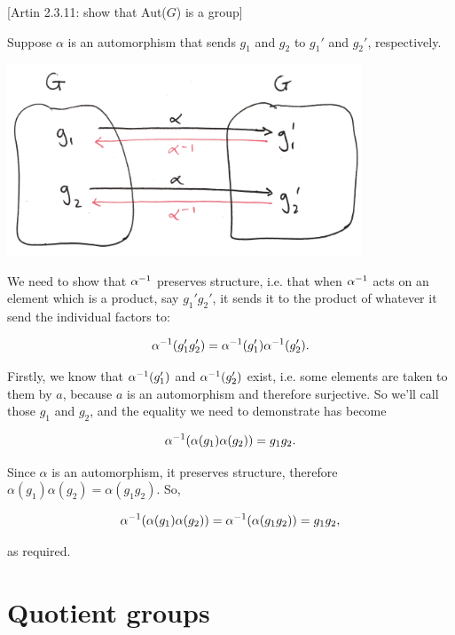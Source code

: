 [Artin 2.3.11: show that Aut($G$) is a group]

Suppose $\alpha$ is an automorphism that sends $g_1$ and $g_2$ to $g_1'$ and
$g_2'$, respectively.

\begin{mdframed}
\includegraphics[width=300pt]{img/inverse-of-automorphism-1.png}
\end{mdframed}

We need to show that $\alpha^{-1}$ preserves structure, i.e. that when $\alpha^{-1}$ acts
on an element which is a product, say $g_1'g_2'$, it sends it to the product of
whatever it send the individual factors to:

$$
\alpha^{-1}(g_1'g_2') = \alpha^{-1}(g_1')\alpha^{-1}(g_2').
$$


Firstly, we know that $\alpha^{-1}(g_1')$ and $\alpha^{-1}(g_2')$ exist, i.e. some elements
are taken to them by $a$, because $a$ is an automorphism and therefore
surjective. So we'll call those $g_1$ and $g_2$, and the equality we need to
demonstrate has become

$$
\alpha^{-1}(\alpha(g_1)\alpha(g_2)) = g_1g_2.
$$

Since $\alpha$ is an automorphism, it preserves structure, therefore
$\alpha(g_1)\alpha(g_2) = \alpha(g_1g_2)$. So,

$$
\alpha^{-1}(\alpha(g_1)\alpha(g_2)) = \alpha^{-1}(\alpha(g_1g_2)) = g_1g_2,
$$

as required.
\newcommand{\textstack}[2]{
  \left(\begin{array}{c}
    \text{#1}  \\
    \text{#2}
  \end{array}\right)
}

\section{Quotient groups}

